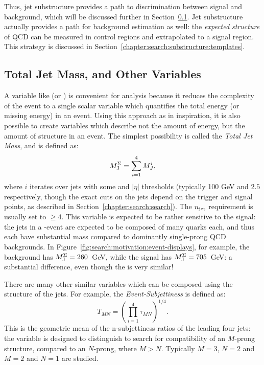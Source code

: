 Thus, jet substructure provides a path to discrimination between signal and background, which will be discussed further in Section~\ref{chapter:search:substructure:mj}. Jet substructure actually provides a path for background estimation as well: the \textit{expected structure} of QCD can be measured in control regions and extrapolated to a signal region. This strategy is discussed in Section~\ref{chapter:search:substructure:templates}. 

\subsection{Total Jet Mass, and Other Variables}
	\label{chapter:search:substructure:mj}

A variable like \Ht (or \met) is convenient for analysis because it reduces the complexity of the event to a single scalar variable which quantifies the total energy (or missing energy) in an event. Using this approach as in inspiration, it is also possible to create variables which describe not the amount of energy, but the amount of structure in an event.  The simplest possibility is called the \textit{Total Jet Mass}, and is defined as:
%
\begin{equation}
M_{\textrm{J}}^{\Sigma} = \sum_{i=1}^4 M_J^i,
\end{equation}
%
where $i$ iterates over jets with some \pt and $|\eta|$ thresholds (typically 100 GeV and $2.5$ respectively, though the exact \pt cuts on the jets depend on the trigger and signal points, as described in Section~\ref{chapter:search:search}). The $n_{\rm jet}$ requirement is usually set to $\geq 4$.  This \MJ variable is expected to be rather sensitive to the signal: the \largeR jets in a \gl-\gl event are expected to be composed of many quarks each, and thus each have substantial mass compared to dominantly single-prong QCD backgrounds. In Figure~\ref{fig:search:motivation:event-displays}, for example, the background has $M_{\textrm{J}}^{\Sigma} = 260$~GeV, while the signal has $M_{\textrm{J}}^{\Sigma} = 705$~GeV: a substantial difference, even though the \HT is very similar!

There are many other similar variables which can be composed using the structure of the \largeR jets. For example, the \textit{Event-Subjettiness} is defined as:
%
\begin{equation}
T_{MN} = \left(\prod_{i=1}^4 \tau_{MN}\right)^{1/4}.
\end{equation}
%
This is the geometric mean of the n-subjettiness ratios of the leading four jets: the variable is designed to distinguish to search for compatibility of an $M$-prong structure, compared to an $N$-prong, where $M>N$. Typically $M=3$, $N=2$ and $M=2$ and $N=1$ are studied.

